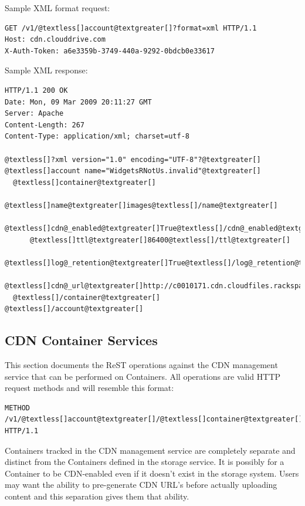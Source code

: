 \documentclass[letterpaper,10pt,english]{manual}
\begin{document}
Sample XML format request:

\begin{Verbatim}[commandchars=@\[\]]
GET /v1/@textless[]account@textgreater[]?format=xml HTTP/1.1
Host: cdn.clouddrive.com
X-Auth-Token: a6e3359b-3749-440a-9292-0bdcb0e33617
\end{Verbatim}

Sample XML response:

\begin{Verbatim}[commandchars=@\[\]]
HTTP/1.1 200 OK
Date: Mon, 09 Mar 2009 20:11:27 GMT
Server: Apache
Content-Length: 267
Content-Type: application/xml; charset=utf-8

@textless[]?xml version="1.0" encoding="UTF-8"?@textgreater[]
@textless[]account name="WidgetsRNotUs.invalid"@textgreater[]
  @textless[]container@textgreater[]
      @textless[]name@textgreater[]images@textless[]/name@textgreater[]
      @textless[]cdn@_enabled@textgreater[]True@textless[]/cdn@_enabled@textgreater[]
      @textless[]ttl@textgreater[]86400@textless[]/ttl@textgreater[]
      @textless[]log@_retention@textgreater[]True@textless[]/log@_retention@textgreater[]
      @textless[]cdn@_url@textgreater[]http://c0010171.cdn.cloudfiles.rackspacecloud.com/@textless[]/cdn@_url@textgreater[]
  @textless[]/container@textgreater[]
@textless[]/account@textgreater[]
\end{Verbatim}


\subsection{CDN Container Services}

This section documents the ReST operations against the CDN management
service that can be performed on Containers. All operations are valid
HTTP request methods and will resemble this format:

\begin{Verbatim}[commandchars=@\[\]]
METHOD /v1/@textless[]account@textgreater[]/@textless[]container@textgreater[] HTTP/1.1
\end{Verbatim}

Containers tracked in the CDN management service are completely separate
and distinct from the Containers defined in the storage service.  It
is possibly for a Container to be CDN-enabled even if it doesn't exist
in the storage system.  Users may want the ability to pre-generate
CDN URL's before actually uploading content and this separation gives
them that ability.
\end{document}
